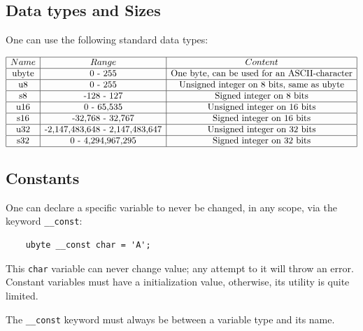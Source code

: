 \documentclass{scrartcl}
\begin{document}
        \subsection{Data types and Sizes}
            One can use the following standard data types:

$\begin{array}{|c|c|c|}
\hline
Name & Range & Content\\
\hline
\text{ubyte} & \text{0 - 255} & \text{One byte, can be used for an ASCII-character}\\
\hline
\text{u8} & \text{0 - 255} & \text{Unsigned integer on 8 bits, same as ubyte}\\
\hline
\text{s8} & \text{-128 - 127} & \text{Signed integer on 8 bits}\\
\hline
\text{u16} & \text{0 - 65,535} & \text{Unsigned integer on 16 bits}\\
\hline
\text{s16} & \text{-32,768 - 32,767} & \text{Signed integer on 16 bits}\\
\hline
\text{u32} & \text{-2,147,483,648 - 2,147,483,647} & \text{Unsigned integer on 32 bits}\\
\hline
\text{s32} & \text{0 - 4,294,967,295} & \text{Signed integer on 32 bits}\\
\hline
\end{array}$
        \subsection{Constants} \label{const}
            One can declare a specific variable to never be changed, in any scope,
            via the keyword \texttt{\_\_const}:
            \begin{lstlisting}
    ubyte __const char = 'A';
            \end{lstlisting}
            This \texttt{char} variable can never change value; any attempt to it
            will throw an error.
            Constant variables must have a initialization value, otherwise, its
            utility is quite limited.

            The \texttt{\_\_const} keyword must always be between a variable
            type and its name.
\end{document}

